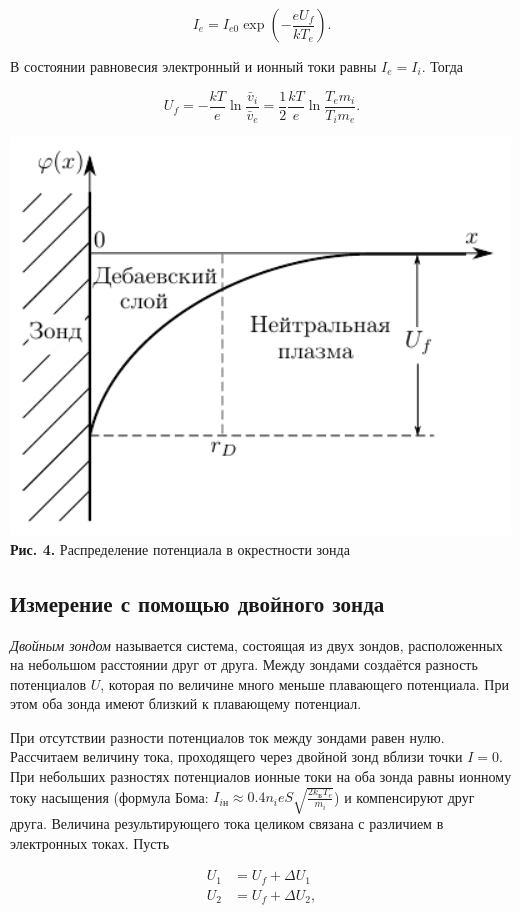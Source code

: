 \documentclass[a4paper,12pt]{article} %
\begin{document}
$$
I_{e} = I_{e0} \exp \left( -\frac{e U_f}{kT_e} \right).
$$
    
\hfill \break В состоянии равновесия электронный и ионный токи равны $I_e = I_i$. Тогда

\begin{equation}\label{ linkname }
U_f = -\frac{kT}{e} \ln{\frac{\bar v_i}{\bar v_e}} = \frac{1}{2} \frac{kT}{e} \ln{\frac{T_e m_i}{T_i m_e}}.
\end{equation}

\begin{center}
\includegraphics[width=0.45\linewidth]{3.5.1_4.png}\\
\textbf{Рис. 4.} Распределение потенциала в окрестности зонда\\
\end{center}
    
\subsection{Измерение с помощью двойного зонда}
    
\hfill \break \textit{Двойным зондом} называется система, состоящая из двух зондов, расположенных на небольшом расстоянии друг от друга. Между зондами создаётся разность потенциалов $U$, которая по величине много меньше плавающего потенциала. При этом оба зонда имеют близкий к плавающему потенциал.

\hfill \break При отсутствии разности потенциалов ток между зондами равен нулю. Рассчитаем величину тока, проходящего через двойной зонд вблизи точки $I = 0$. При небольших разностях потенциалов ионные токи на оба зонда равны ионному току насыщения (формула Бома: $I_{i\text{н}} \approx 0.4n_{i}eS\sqrt{\frac{2k_\text{Б}T_{e}}{m_{i}}}$) и компенсируют друг друга. Величина результирующего тока целиком связана с различием в электронных токах. Пусть
    
\begin{equation}\label{ linkname }
    \begin{split}
    	U_1 &= U_f + \Delta U_1 \\
    	U_2 &= U_f + \Delta U_2,
    \end{split}
\end{equation}
\end{document}
